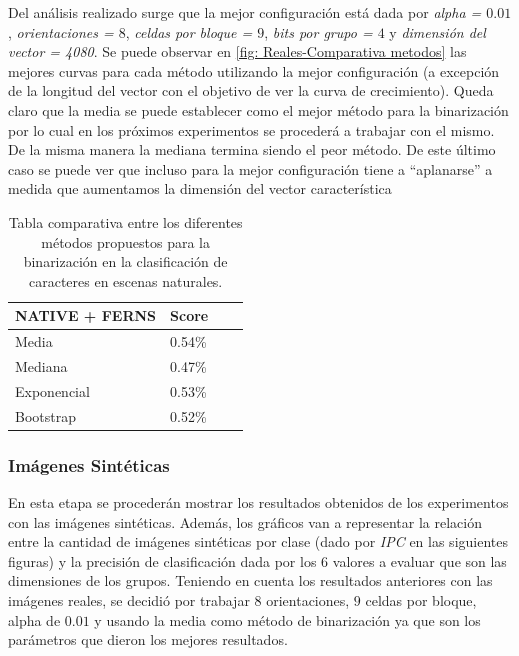 	Del análisis realizado surge que la mejor configuración está dada por \textit{alpha = $0.01$}, \textit{orientaciones = $8$}, \textit{celdas por bloque = $9$}, \textit{bits por grupo = $4$} y \textit{dimensión del vector = 4080}. Se puede observar en \ref{fig: Reales-Comparativa metodos} las mejores curvas para cada método utilizando la mejor configuración (a excepción de la longitud del vector con el objetivo de ver la curva de crecimiento). Queda claro que la media se puede establecer como el mejor método para la binarización por lo cual en los próximos experimentos se procederá a trabajar con el mismo. De la misma manera la mediana termina siendo el peor método. De este último caso se puede ver que incluso para la mejor configuración tiene a ``aplanarse'' a medida que aumentamos la dimensión del vector característica
		
\newpage

	\begin{table}
		\centering
		\begin{tabular}{ | l | l | l | p{5cm} |}
    			\hline
    				\textbf{NATIVE + FERNS} & \textbf{Score} \\ \hline
    				Media & 0.54\% \\ \hline
    				Mediana & 0.47\%\\ \hline
    				Exponencial & 0.53\% \\ \hline
    				Bootstrap & 0.52\%\\ 
    			\hline
    		\end{tabular}
    		\caption[Resultados imagenes naturales]{Tabla comparativa entre los diferentes métodos propuestos para la binarización en la clasificación de caracteres en escenas naturales.}
    		\label{table: reales-comparativa}
    	\end{table}
    	
    	
    	\newpage
    	\subsubsection{Imágenes Sintéticas}
    	
    En esta etapa se procederán mostrar los resultados obtenidos de los experimentos con las imágenes sintéticas. Además, los gráficos van a representar la relación entre la cantidad de imágenes sintéticas por clase (dado por \textit{IPC} en las siguientes figuras) y la precisión de clasificación dada por los $6$ valores a evaluar que son las dimensiones de los grupos. Teniendo en cuenta los resultados anteriores con las imágenes reales, se decidió por trabajar $8$ orientaciones, $9$ celdas por bloque, alpha de $0.01$ y usando la media como método de binarización ya que son los parámetros que dieron los mejores resultados.
    
